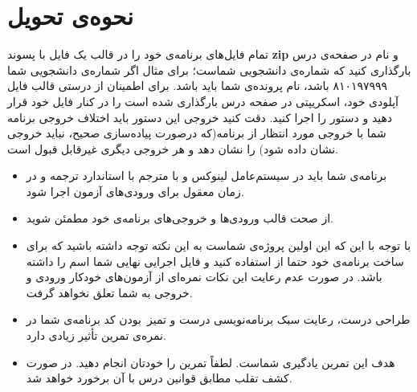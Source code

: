 \documentclass{utap}
\begin{document}
	\section{نحوه‌ی تحویل}
	\hspace{5mm}
	تمام فایل‌های برنامه‌ی خود را در قالب یک فایل با پسوند \textbf{zip} و نام  در صفحه‌ی  درس بارگذاری کنید که  شماره‌ی دانشجویی شماست؛ برای مثال اگر شماره‌ی دانشجویی شما ۸۱۰۱۹۷۹۹۹ باشد، نام پرونده‌ی شما باید  باشد. 
	\newline
	برای اطمینان از درستی قالب فایل آپلودی خود، اسکریپتی در صفحه درس بارگذاری شده است را در کنار فایل خود قرار دهید و دستور
	را اجرا کنید. دقت کنید خروجی این دستور باید اختلاف خروجی برنامه شما با خروجی مورد انتظار از برنامه(که درصورت پیاده‌سازی صحیح، نباید خروجی نشان داده شود) را نشان دهد و هر خروجی دیگری غیرقابل قبول است.
	\begin{itemize}
		\item برنامه‌ی شما باید در سیستم‌عامل لینوکس و با مترجم  با استاندارد  ترجمه و در زمان معقول برای ورودی‌های آزمون اجرا شود.
		\item از صحت قالب ورودی‌ها و خروجی‌های برنامه‌ی خود مطمئن شوید.
		\item با توجه با این که این اولین پروژه‌ی  شماست به این نکته توجه داشته باشید که برای ساخت برنامه‌ی خود حتما از  استفاده کنید و فایل اجرایی نهایی شما اسم  را داشته باشد. در صورت عدم رعایت این نکات نمره‌ای از آزمون‌های خودکار ورودی و خروجی به شما تعلق نخواهد گرفت.
		\item طراحی درست، رعایت سبک برنامه‌نویسی درست و تمیز~بودن کد برنامه‌ی شما در نمره‌ی تمرین تأثیر زیادی دارد.
		\item هدف این تمرین یادگیری شماست. لطفاً تمرین را خودتان انجام دهید. در صورت کشف تقلب مطابق قوانین درس با آن برخورد خواهد شد.
	\end{itemize}
	
	
\end{document}
